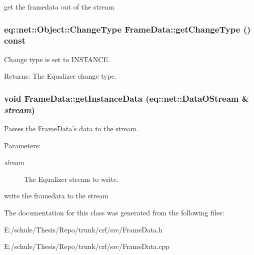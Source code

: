 get the framedata out of the stream \hypertarget{a00010_00b26118522849f58fcc66b140a1c005}{
\subsubsection[{getChangeType}]{\setlength{\rightskip}{0pt plus 5cm}eq::net::Object::ChangeType FrameData::getChangeType () const}}
\label{a00010_00b26118522849f58fcc66b140a1c005}


Change type is set to INSTANCE. 

\begin{Desc}
\item[Returns:]The Equalizer change type. \end{Desc}
\hypertarget{a00010_67d459f6a98840d88b1a0955aa4f517e}{
\subsubsection[{getInstanceData}]{\setlength{\rightskip}{0pt plus 5cm}void FrameData::getInstanceData (eq::net::DataOStream \& {\em stream})}}
\label{a00010_67d459f6a98840d88b1a0955aa4f517e}


Passes the FrameData's data to the stream. 

\begin{Desc}
\item[Parameters:]
\begin{description}
\item[{\em stream}]The Equalizer stream to write. \end{description}
\end{Desc}


write the framedata to the stream 

The documentation for this class was generated from the following files:\begin{CompactItemize}
\item 
E:/schule/Thesis/Repo/trunk/crf/src/FrameData.h\item 
E:/schule/Thesis/Repo/trunk/crf/src/FrameData.cpp\end{CompactItemize}
